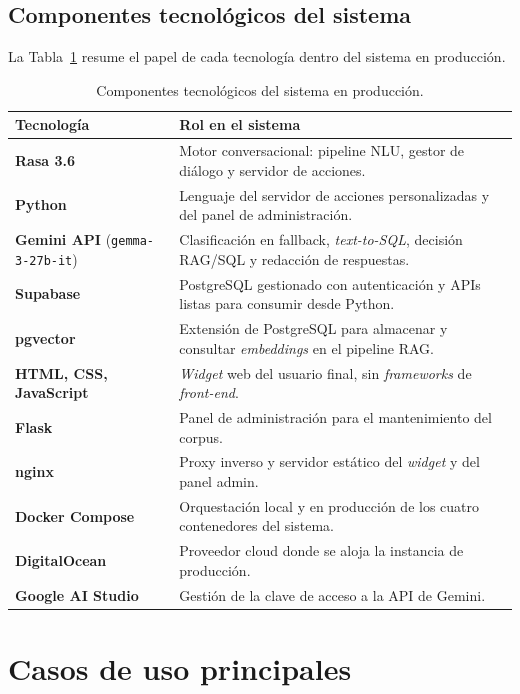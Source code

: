 \subsection{Componentes tecnológicos del sistema}

La Tabla~\ref{tab:tech-stack} resume el papel de cada tecnología dentro del sistema en producción.

\begin{table}[h]
\centering
\small
\begin{tabular}{|l|p{9cm}|}
\hline
\rowcolor{black!10}
\textbf{Tecnología} & \textbf{Rol en el sistema} \\ \hline
\textbf{Rasa 3.6} & Motor conversacional: pipeline NLU, gestor de diálogo y servidor de acciones. \\ \hline
\textbf{Python} & Lenguaje del servidor de acciones personalizadas y del panel de administración. \\ \hline
\textbf{Gemini API} (\texttt{gemma-3-27b-it}) & Clasificación en fallback, \textit{text-to-SQL}, decisión RAG/SQL y redacción de respuestas. \\ \hline
\textbf{Supabase} & PostgreSQL gestionado con autenticación y APIs listas para consumir desde Python. \\ \hline
\textbf{pgvector} & Extensión de PostgreSQL para almacenar y consultar \textit{embeddings} en el pipeline RAG. \\ \hline
\textbf{HTML, CSS, JavaScript} & \textit{Widget} web del usuario final, sin \textit{frameworks} de \textit{front-end}. \\ \hline
\textbf{Flask} & Panel de administración para el mantenimiento del corpus. \\ \hline
\textbf{nginx} & Proxy inverso y servidor estático del \textit{widget} y del panel admin. \\ \hline
\textbf{Docker Compose} & Orquestación local y en producción de los cuatro contenedores del sistema. \\ \hline
\textbf{DigitalOcean} & Proveedor cloud donde se aloja la instancia de producción. \\ \hline
\textbf{Google AI Studio} & Gestión de la clave de acceso a la API de Gemini. \\ \hline
\end{tabular}
\caption{Componentes tecnológicos del sistema en producción.}
\label{tab:tech-stack}
\end{table}

\section{Casos de uso principales}
\label{sec:casos-uso}

